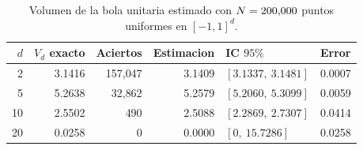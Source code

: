 \begin{table}[htbp]\centering
\caption{Volumen de la bola unitaria estimado con $N=200{,}000$ puntos uniformes en $[-1,1]^d$.}
\label{tab:volumenes}
\small
\begin{tabular}{r|r|r|r|l|l}
\toprule
$d$ & $V_d$ exacto & Aciertos & Estimacion & IC $95\%$ & Error \\
\midrule
2 & 3.1416 & 157{,}047 & 3.1409 & $[3.1337,\ 3.1481]$ & 0.0007 \\
5 & 5.2638 & 32{,}862 & 5.2579 & $[5.2060,\ 5.3099]$ & 0.0059 \\
10 & 2.5502 & 490 & 2.5088 & $[2.2869,\ 2.7307]$ & 0.0414 \\
20 & 0.0258 & 0 & 0.0000 & $[0,\ 15.7286]$ & 0.0258 \\
\bottomrule
\end{tabular}
\end{table}
